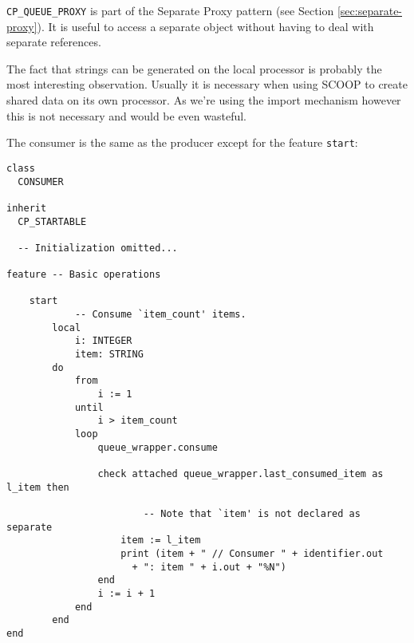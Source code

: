 \lstinline!CP_QUEUE_PROXY! is part of the Separate Proxy pattern  (see Section \ref{sec:separate-proxy}).
It is useful to access a separate object without having to deal with separate references.

The fact that strings can be generated on the local processor is probably the most interesting observation.
Usually it is necessary when using SCOOP to create shared data on its own processor.
As we're using the import mechanism however this is not necessary and would be even wasteful.



The consumer is the same as the producer except for the feature \lstinline!start!:

\begin{lstlisting}[language=OOSC2Eiffel, captionpos=b, caption={The consumer class.}]
class
  CONSUMER
  
inherit
  CP_STARTABLE

  -- Initialization omitted...

feature -- Basic operations

	start
			-- Consume `item_count' items.
		local
			i: INTEGER
			item: STRING
		do
			from
				i := 1
			until
				i > item_count
			loop
				queue_wrapper.consume

				check attached queue_wrapper.last_consumed_item as l_item then

						-- Note that `item' is not declared as separate
					item := l_item
					print (item + " // Consumer " + identifier.out 
					  + ": item " + i.out + "%N")
				end
				i := i + 1
			end
		end
end
\end{lstlisting}

